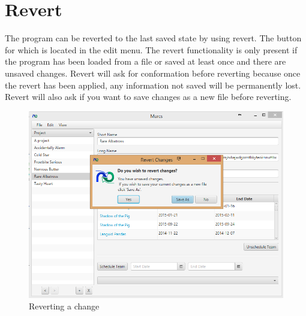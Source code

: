 \section{Revert}

The program can be reverted to the last saved state by using revert. The button for which is located in the edit menu.
The revert functionality is only present if the program has been loaded from a file or saved at least once and there are unsaved changes.
Revert will ask for conformation before reverting because once the revert has been applied, any information not saved will be permanently lost.
Revert will also ask if you want to save changes as a new file before reverting.
\newline\newline


\begin{figure}[H]
\centering
\includegraphics[width=\textwidth]{images/screenshots/revert1.PNG}
\caption{Reverting a change}
\label{fig:revert}
\end{figure}
